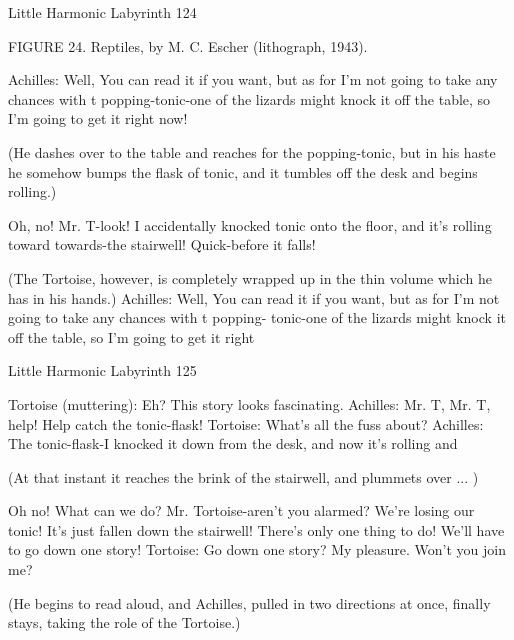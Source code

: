 Little Harmonic Labyrinth                                                            124

                      FIGURE 24. Reptiles, by M. C. Escher (lithograph, 1943).

               Achilles: Well, You can read it if you want, but as for I'm not going to
                      take any chances with t popping-tonic-one of the lizards might
                      knock it off the table, so I'm going to get it right now!

                  (He dashes over to the table and reaches for the popping-tonic, but in
                  his haste he somehow bumps the flask of tonic, and it tumbles off the
                  desk and begins rolling.)

               Oh, no! Mr. T-look! I accidentally knocked tonic onto the floor, and it's
                      rolling toward towards-the stairwell! Quick-before it falls!

               (The Tortoise, however, is completely wrapped up in the thin volume
                     which he has in his hands.) Achilles: Well, You can read it if you
                     want, but as for I'm not going to take any chances with t popping-
                     tonic-one of the lizards might knock it off the table, so I'm going
                     to get it right




Little Harmonic Labyrinth                                                           125

               Tortoise (muttering): Eh? This story looks fascinating.
               Achilles: Mr. T, Mr. T, help! Help catch the tonic-flask!
               Tortoise: What's all the fuss about?
               Achilles: The tonic-flask-I knocked it down from the desk, and now it's
                      rolling and

                  (At that instant it reaches the brink of the stairwell, and plummets
                  over ... )

                 Oh no! What can we do? Mr. Tortoise-aren't you alarmed? We're
                 losing our tonic! It's just fallen down the stairwell! There's only one
                 thing to do! We'll have to go down one story!
               Tortoise: Go down one story? My pleasure. Won't you join me?

                  (He begins to read aloud, and Achilles, pulled in two directions at
                  once, finally stays, taking the role of the Tortoise.)


